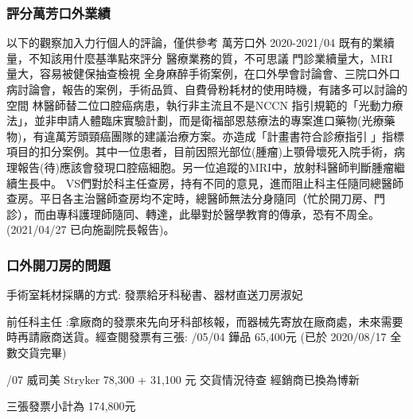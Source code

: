 \documentclass[t,24pt,aspectratio=169]{beamer}
\begin{document}
\begin{frame}[hoved]
\frametitle{評分萬芳口外業績}
\begin{outline}
\1 以下的觀察加入力行個人的評論，僅供參考
    \2 萬芳口外 2020-2021/04 既有的業續量，不知該用什麼基準點來評分
    \2 醫療業務的質，不可思議
        \3 門診業續量大，MRI 量大，容易被健保抽查檢視
        \3 全身麻醉手術案例，在口外學會討論會、三院口外口病討論會，報告的案例，手術品質、自費骨粉耗材的使用時機，有諸多可以討論的空間
        \3 林醫師替二位口腔癌病患，執行非主流且不是NCCN 指引規範的「光動力療法」，並非申請人體臨床實驗計劃，而是衛福部恩慈療法的專案進口藥物(光療藥物)，有違萬芳頭頸癌團隊的建議治療方案。亦造成「計畫書符合診療指引 」指標項目的扣分案例。其中一位患者，目前因照光部位(腫瘤)上顎骨壞死入院手術，病理報告(待)應該會發現口腔癌細胞。另一位追蹤的MRI中，放射科醫師判斷腫瘤繼續生長中。
        \3 VS們對於科主任查房，持有不同的意見，進而阻止科主任隨同總醫師查房。平日各主治醫師查房均不定時，總醫師無法分身隨同（忙於開刀房、門診），而由專科護理師隨同、轉達，此舉對於醫學教育的傳承，恐有不周全。(2021/04/27 已向施副院長報告)。
    
\end{outline}


\end{frame}

\begin{frame}[hoved]
\frametitle{口外開刀房的問題}
手術室耗材採購的方式: 發票給牙科秘書、器材直送刀房淑妃




\begin{outline}
\1 前任科主任 :拿廠商的發票來先向牙科部核報，而器械先寄放在廠商處，未來需要時再請廠商送貨。經查閱發票有三張:
/05/04 鏵品 65,400元 (已於 2020/08/17 全數交貨完畢)

/07 威司美 Stryker 78,300 + 31,100 元
    \3 交貨情況待查
     經銷商已換為博新

\1 三張發票小計為 174,800元

\end{outline}



\end{frame}
\end{document}
